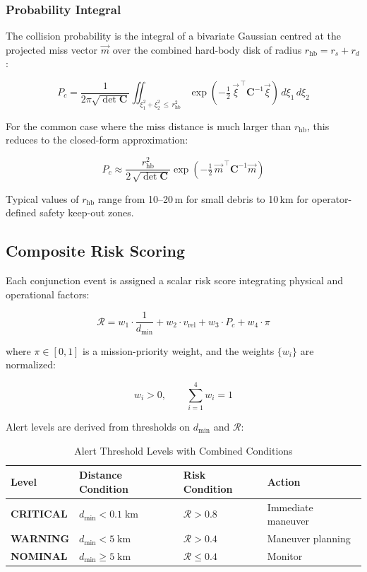 \documentclass[11pt, a4paper]{article}
\newcommand{\critical}[1]{\textcolor{alertred}{\textbf{#1}}}
\newcommand{\safe}[1]{\textcolor{safegreen}{\textbf{#1}}}
\begin{document}
\subsubsection{Probability Integral}

The collision probability is the integral of a bivariate Gaussian centred at the projected
miss vector $\vec{m}$ over the combined hard-body disk of radius $r_{\text{hb}} = r_s + r_d$:

\[
  P_c =
  \frac{1}{2\pi\sqrt{\det\mathbf{C}}}
  \iint_{\xi_1^2 + \xi_2^2 \,\leq\, r_{\text{hb}}^2}
  \exp\!\left(-\tfrac{1}{2}\,\vec{\xi}^{\,\top}\mathbf{C}^{-1}\vec{\xi}\right)
  \,d\xi_1\,d\xi_2
\]

For the common case where the miss distance is much larger than $r_{\text{hb}}$, this reduces to
the closed-form approximation:

\[
  P_c \approx \frac{r_{\text{hb}}^2}{2\,\sqrt{\det\mathbf{C}}}
  \exp\!\left(-\tfrac{1}{2}\,\vec{m}^{\,\top}\mathbf{C}^{-1}\vec{m}\right)
\]

Typical values of $r_{\text{hb}}$ range from 10--20\,m for small debris to 10\,km for
operator-defined safety keep-out zones.

\subsection{Composite Risk Scoring}

Each conjunction event is assigned a scalar risk score integrating physical and operational factors:

\[
  \mathcal{R} = w_1 \cdot \frac{1}{d_{\min}} + w_2 \cdot v_{\text{rel}} + w_3 \cdot P_c + w_4 \cdot \pi
\]

where $\pi \in [0,1]$ is a mission-priority weight, and the weights $\{w_i\}$ are normalized:

\[
  w_i > 0, \qquad \sum_{i=1}^{4} w_i = 1
\]

Alert levels are derived from thresholds on $d_{\min}$ and $\mathcal{R}$:

\begin{table}[H]
\centering
\small
\begin{tabular}{p{2.2cm} p{3.2cm} p{2.8cm} p{3.5cm}}
\toprule
\textbf{Level} & \textbf{Distance Condition} & \textbf{Risk Condition} & \textbf{Action} \\
\midrule
\critical{CRITICAL} & $d_{\min} < 0.1\;\text{km}$ & $\mathcal{R} > 0.8$ & Immediate maneuver \\
\textbf{WARNING}    & $d_{\min} < 5\;\text{km}$   & $\mathcal{R} > 0.4$ & Maneuver planning \\
\safe{NOMINAL}      & $d_{\min} \geq 5\;\text{km}$& $\mathcal{R} \leq 0.4$ & Monitor \\
\bottomrule
\end{tabular}
\caption{Alert Threshold Levels with Combined Conditions}
\end{table}
\end{document}
